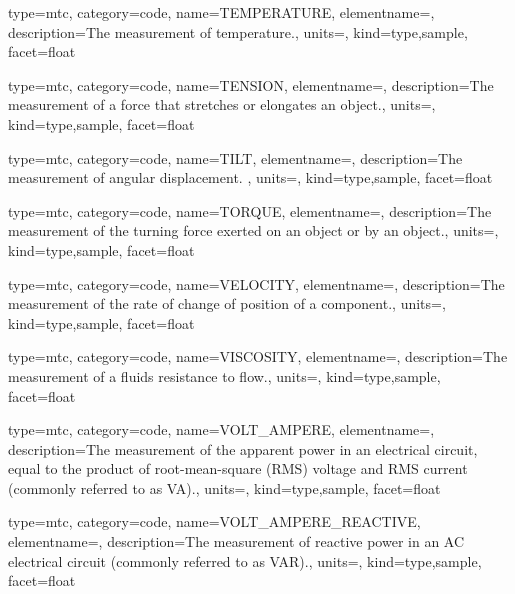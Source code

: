 {
  type=mtc,
  category=code,
  name={TEMPERATURE},
  elementname=,
  description={The measurement of temperature.},
  units=,
  kind={type,sample},
  facet={\gls{float}}
}


{
  type=mtc,
  category=code,
  name={TENSION},
  elementname=,
  description={The measurement of a force that stretches or elongates an object.},
  units=,
  kind={type,sample},
  facet={\gls{float}}
}


{
  type=mtc,
  category=code,
  name={TILT},
  elementname=,
  description={The measurement of angular displacement. },
  units=,
  kind={type,sample},
  facet={\gls{float}}
}


{
  type=mtc,
  category=code,
  name={TORQUE},
  elementname=,
  description={The measurement of the turning force exerted on an object or by an object.},
  units=,
  kind={type,sample},
  facet={\gls{float}}
}


{
  type=mtc,
  category=code,
  name={VELOCITY},
  elementname=,
  description={The measurement of the rate of change of position of a \gls{component}.},
  units=,
  kind={type,sample},
  facet={\gls{float}}
}


{
  type=mtc,
  category=code,
  name={VISCOSITY},
  elementname=,
  description={The measurement of a fluids resistance to flow.},
  units=,
  kind={type,sample},
  facet={\gls{float}}
}


{
  type=mtc,
  category=code,
  name={VOLT\_AMPERE},
  elementname=,
  description={The measurement of the apparent power in an electrical circuit, equal to the product of root-mean-square (RMS) voltage and RMS current (commonly referred to as VA).},
  units=,
  kind={type,sample},
  facet={\gls{float}}
}


{
  type=mtc,
  category=code,
  name={VOLT\_AMPERE\_REACTIVE},
  elementname=,
  description={The measurement of reactive power in an AC electrical circuit (commonly referred to as VAR).},
  units=,
  kind={type,sample},
  facet={\gls{float}}
}


